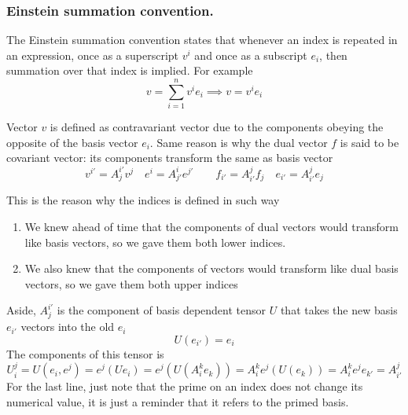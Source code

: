 \documentclass[../../../main.tex]{subfiles}
\begin{document}
\subsubsection{Einstein summation convention.}
The Einstein summation convention states that whenever an index is repeated in an expression, once as a superscript $v^i$ and once as a subscript $e_i$, then summation over that index is implied.
For example
\begin{equation*}
  v = \sum\limits_{i=1}^{n} v^{i} e_{i} \implies v = v^{i} e_{i}
\end{equation*}

Vector $v$ is defined as contravariant vector  due to the components obeying the opposite of the basis vector $e_i$.
Same reason is why the dual vector $f$ is said to be covariant vector: its components transform the same as basis vector
\begin{equation*}
  v^{i'} = A^{i'}_{j} v^{j}\quad
  e^{i} = A^{i}_{j'} e^{j'}    \qquad
  f_{i'} = A^{j}_{i'} f_{j}\quad
  e_{i'} = A_{i'}^{j} e_{j}
\end{equation*}

This is the reason why the indices is defined in such way
\begin{enumerate}
  \item We knew ahead of time that the components of dual vectors would transform like basis vectors, so we gave them both lower indices.
  \item We also knew that the components of vectors would
        transform like dual basis vectors, so we gave them both upper indices
\end{enumerate}

Aside, $A^{i'}_{j}$ is the component of basis dependent tensor $U$ that takes the new basis $e_{i'}$ vectors into the old $e_i$
\begin{equation*}
  U(e_{i'})=e_i
\end{equation*}
The components of this tensor is
\begin{equation*}
  U^{j}_{i} = U(e_{i}, e^{j}) = e^{j}(U e_{i}) = e^{j}(U(A^{k}_{i} e_{k})) = A^{k}_{i} e^{j}(U(e_{k})) = A^{k}_{i} e^{j} e_{k'} = A^{j}_{i'}
\end{equation*}
For the last line, just note that the prime on an index does not change its numerical value, it is just a reminder that it refers to the primed basis.
\end{document}
